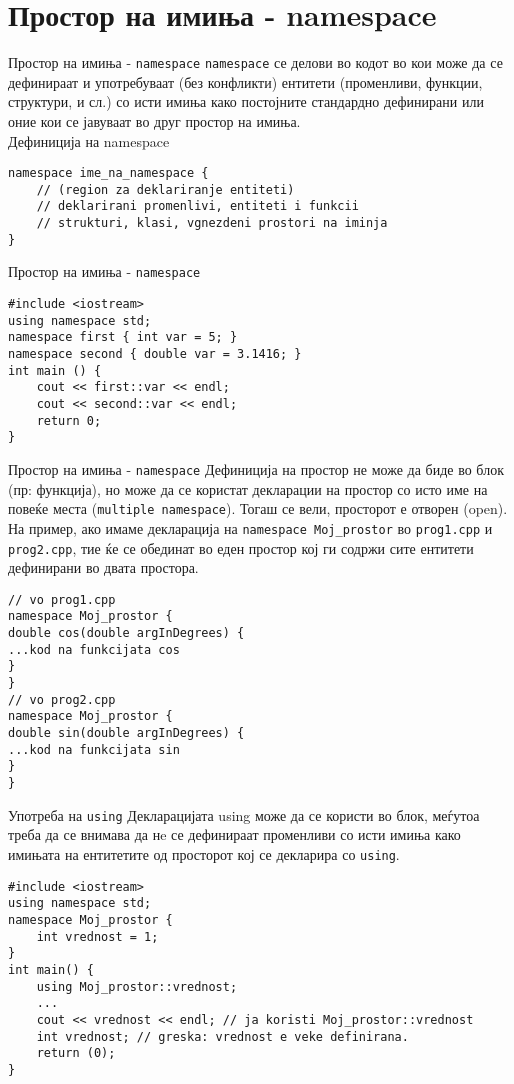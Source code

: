 \section{Простор на имиња - namespace}
\begin{frame}[fragile]{Простор на имиња - \texttt{namespace}}
\texttt{namespace} се делови во кодот во кои може да се дефинираат и употребуваат (без
конфликти) ентитети (променливи, функции, структури, и сл.) со исти имиња како
постојните стандардно дефинирани или оние кои се јавуваат во друг простор на
имиња.\\
Дефиниција на namespace
\begin{lstlisting}
namespace ime_na_namespace {
    // (region za deklariranje entiteti)
    // deklarirani promenlivi, entiteti i funkcii
    // strukturi, klasi, vgnezdeni prostori na iminja
}
\end{lstlisting}
\end{frame}

\begin{frame}[fragile]{Простор на имиња - \texttt{namespace}}
\begin{lstlisting}
#include <iostream> 
using namespace std; 
namespace first { int var = 5; } 
namespace second { double var = 3.1416; } 
int main () { 
    cout << first::var << endl; 
    cout << second::var << endl; 
    return 0; 
}
\end{lstlisting}
\end{frame}


\begin{frame}[fragile]{Простор на имиња - \texttt{namespace}}
Дефиниција на простор не може да биде во блок (пр: функција), но може да се
користат декларации на простор со исто име на повеќе места (\texttt{multiple namespace}).
Тогаш се вели, просторот е отворен (open).
На пример, ако имаме декларација на \texttt{namespace Moj\_prostor} во
\texttt{prog1.cpp} и \texttt{prog2.cpp}, тие ќе се обединат во еден простор кој
ги содржи сите ентитети дефинирани во двата простора.
\begin{lstlisting}
// vo prog1.cpp
namespace Moj_prostor {
double cos(double argInDegrees) {
...kod na funkcijata cos
}
}
// vo prog2.cpp
namespace Moj_prostor {
double sin(double argInDegrees) {
...kod na funkcijata sin
}
}
\end{lstlisting}
\end{frame}


\begin{frame}[fragile]{Употреба на \texttt{using}}
Декларацијата using може да се користи во блок, меѓутоа треба да се внимава да
нe се дефинираат променливи со исти имиња како имињата на ентитетите од просторот
кој се декларира со \texttt{using}.
\begin{lstlisting}
#include <iostream>
using namespace std;
namespace Moj_prostor {
    int vrednost = 1;
}
int main() {
    using Moj_prostor::vrednost;
    ...
    cout << vrednost << endl; // ja koristi Moj_prostor::vrednost
    int vrednost; // greska: vrednost e veke definirana.
    return (0);
}
\end{lstlisting}
\end{frame}

